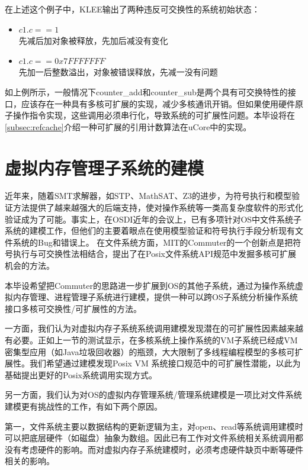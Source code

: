 在上述这个例子中，KLEE输出了两种违反可交换性的系统初始状态：
\begin{itemize}
	\item ${c1.c == 1}$ \\
		先减后加对象被释放，先加后减没有变化
	\item ${c1.c ==
		0x7FFFFFFF}$ \\
		先加一后整数溢出，对象被错误释放，先减一没有问题
\end{itemize}

如上例所示，一般情况下counter\_add和counter\_sub是两个具有可交换特性的接口，应该存在一种具有多核可扩展的实现，减少多核通讯开销。但如果使用硬件原子操作指令实现，这些调用必须串行化，导致系统的可扩展性问题。本毕设将在\ref{subsec:refcache}介绍一种可扩展的引用计数算法在uCore中的实现。

\section{虚拟内存管理子系统的建模}
\label{sec:vm-model}

近年来，随着SMT求解器，如STP、MathSAT、Z3\cite{DeMoura:2008:ZES:1792734.1792766}的进步，为符号执行和模型验证方法提供了越来越强大的后端支持，使对操作系统等一类高复杂度软件的形式化验证成为了可能。事实上，在OSDI近年的会议上，已有多项针对OS中文件系统子系统的建模工作\cite{radixvm:eurosys13}\cite{Yang:2006:UMC:1189256.1189259}，但他们的主要着眼点在使用模型验证和符号执行手段分析现有文件系统的Bug和错误上。
在文件系统方面，MIT的Commuter\cite{commuter:2013}的一个创新点是把符号执行与可交换性法相结合，提出了在Posix文件系统API规范中发掘多核可扩展机会的方法。

本毕设希望把Commuter的思路进一步扩展到OS的其他子系统，通过为操作系统虚拟内存管理、进程管理子系统进行建模，提供一种可以跨OS子系统分析操作系统接口多核可交换性/可扩展性的方法。

一方面，我们认为对虚拟内存子系统系统调用建模发现潜在的可扩展性因素越来越有必要。正如上一节的测试显示，在多核系统上操作系统的VM子系统已经成VM密集型应用（如Java垃圾回收器）的瓶颈，大大限制了多线程编程模型的多核可扩展性。我们希望通过建模发现Posix VM 系统接口规范中的可扩展性潜能，以此为基础提出更好的Posix系统调用实现方式。

另一方面，我们认为对OS的虚拟内存管理系统/管理系统建模是一项比对文件系统建模更有挑战性的工作，有如下两个原因。

第一，文件系统主要以数据结构的更新逻辑为主，对open、read等系统调用建模时可以把底层硬件（如磁盘）抽象为数组。因此已有工作对文件系统相关系统调用都没有考虑硬件的影响。而对虚拟内存子系统建模时，必须考虑硬件缺页中断等硬件相关的影响。

